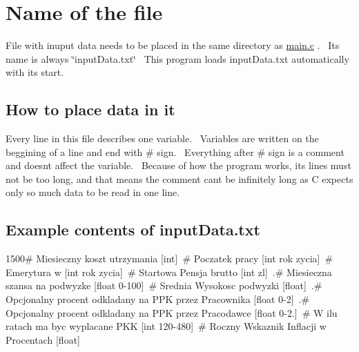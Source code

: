 \hypertarget{inputData_name}{}\section{Name of the file}\label{inputData_name}
File with inuput data needs to be placed in the same directory as \mbox{\hyperlink{main_8c}{main.\+c}} .~\newline
 It\textquotesingle{}s name is always \char`\"{}input\+Data.\+txt\char`\"{}~\newline
 This program loads input\+Data.\+txt automatically with it\textquotesingle{}s start.\hypertarget{inputData_howto}{}\subsection{How to place data in it}\label{inputData_howto}
Every line in this file describes one variable.~\newline
 Variables are written on the beggining of a line and end with \# sign.~\newline
 Everything after \# sign is a comment and doesn\textquotesingle{}t affect the variable.~\newline
 Because of how the program works, it\textquotesingle{}s lines must not be too long, and that means the comment can\textquotesingle{}t be infinitely long as C expects only so much data to be read in one line. \hypertarget{inputData_subsection2}{}\subsection{Example contents of input\+Data.\+txt}\label{inputData_subsection2}
1500\# Miesieczny koszt utrzymania \mbox{[}int\mbox{]}~\# Poczatek pracy \mbox{[}int rok zycia\mbox{]}~\# Emerytura w \mbox{[}int rok zycia\mbox{]}~\# Startowa Pensja brutto \mbox{[}int zl\mbox{]}~.\# Miesieczna szansa na podwyzke \mbox{[}float 0-\/100\mbox{]}~\# Srednia Wysokosc podwyzki \mbox{[}float\mbox{]}~.\# Opcjonalny procent odkladany na P\+PK przez Pracownika \mbox{[}float 0-\/2\mbox{]}~.\# Opcjonalny procent odkladany na P\+PK przez Pracodawce \mbox{[}float 0-\/2.\mbox{]}~\# W ilu ratach ma byc wyplacane P\+KK \mbox{[}int 120-\/480\mbox{]}~\# Roczny Wskaznik Inflacji w Procentach \mbox{[}float\mbox{]} 